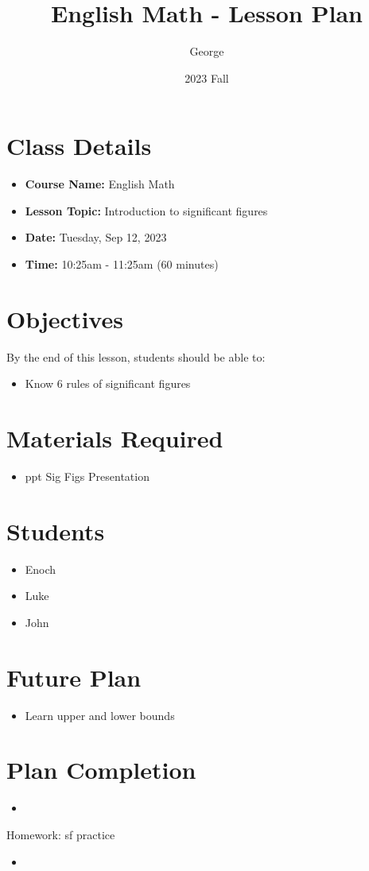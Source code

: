 \documentclass[12pt]{article}
\title{English Math - Lesson Plan}
\author{George}
\date{2023 Fall}
\begin{document}
\maketitle

\section{Class Details}
\begin{itemize}
    \item \textbf{Course Name:} English Math
    \item \textbf{Lesson Topic:}  Introduction to significant figures
    \item \textbf{Date:} Tuesday, Sep 12, 2023
    \item \textbf{Time:} 10:25am - 11:25am (60 minutes)
\end{itemize}

\section{Objectives}
By the end of this lesson, students should be able to:
\begin{itemize}
    \item Know 6 rules of significant figures
   

\end{itemize}

\section{Materials Required}
\begin{itemize}
   
    \item ppt Sig Figs Presentation

  
\end{itemize}


\section{Students}
\begin{itemize}
    \item Enoch
    \item Luke
    \item John

\end{itemize}


\section{Future Plan}
\begin{itemize}
    \item Learn upper and lower bounds

\end{itemize}
\section{Plan Completion}
\begin{itemize}
    \item 
\end{itemize}
Homework: sf practice
\begin{itemize}
    \item 
\end{itemize}
\end{document}
